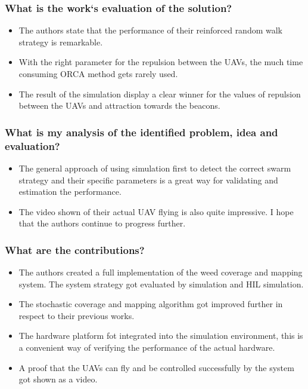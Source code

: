     \subsubsection*{What is the work`s evaluation of the solution?}
    \begin{itemize}
        \item The authors state that the performance of their reinforced random walk strategy is remarkable.
        \item With the right parameter for the repulsion between the UAVs, the much time consuming ORCA method gets rarely used.
        \item The result of the simulation display a clear winner for the values of repulsion between the UAVs and attraction towards the beacons. 
    \end{itemize}
    \subsubsection*{What is my analysis of the identified problem, idea and evaluation?}
    \begin{itemize}
        \item The general approach of using simulation first to detect the correct swarm strategy and their specific parameters is a great way for validating and estimation the performance.
        \item The video shown of their actual UAV flying is also quite impressive.  I hope that the authors continue to progress further.
    \end{itemize}
    \subsubsection*{What are the contributions?}
    \begin{itemize}
        \item The authors created a full implementation of the weed coverage and mapping system. The system strategy got evaluated by simulation and HIL simulation.
        \item The stochastic coverage and mapping algorithm got improved further in respect to their previous works.
        \item The hardware platform fot integrated into the simulation environment, this is a convenient way of verifying the performance of the actual hardware.
        \item A proof that the UAVs can fly and be controlled successfully by the system got shown as a video.
    \end{itemize}
